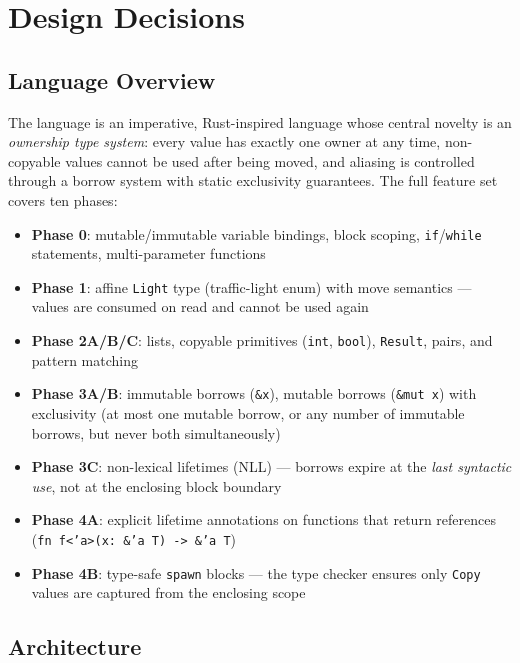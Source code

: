 \section{Design Decisions}

\subsection{Language Overview}

The language is an imperative, Rust-inspired language whose central novelty is
an \emph{ownership type system}: every value has exactly one owner at any time,
non-copyable values cannot be used after being moved, and aliasing is controlled
through a borrow system with static exclusivity guarantees.
The full feature set covers ten phases:

\begin{itemize}
  \item \textbf{Phase 0}: mutable/immutable variable bindings, block scoping,
    \texttt{if}/\texttt{while} statements, multi-parameter functions
  \item \textbf{Phase 1}: affine \texttt{Light} type (traffic-light enum) with
    move semantics --- values are consumed on read and cannot be used again
  \item \textbf{Phase 2A/B/C}: lists, copyable primitives (\texttt{int},
    \texttt{bool}), \texttt{Result}, pairs, and pattern matching
  \item \textbf{Phase 3A/B}: immutable borrows (\texttt{\&x}), mutable borrows
    (\texttt{\&mut x}) with exclusivity (at most one mutable borrow, or any
    number of immutable borrows, but never both simultaneously)
  \item \textbf{Phase 3C}: non-lexical lifetimes (NLL) --- borrows expire at
    the \emph{last syntactic use}, not at the enclosing block boundary
  \item \textbf{Phase 4A}: explicit lifetime annotations on functions that
    return references (\texttt{fn f<'a>(x: \&'a T) -> \&'a T})
  \item \textbf{Phase 4B}: type-safe \texttt{spawn} blocks --- the type checker
    ensures only \texttt{Copy} values are captured from the enclosing scope
\end{itemize}

\subsection{Architecture}

